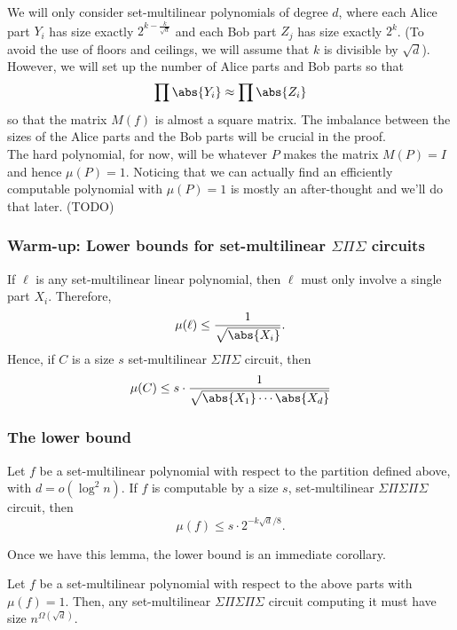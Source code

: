 We will only consider set-multilinear polynomials of degree $d$, where each Alice part $Y_i$ has size exactly $2^{k - \frac{k}{\sqrt{d}}}$ and each Bob part $Z_j$ has size exactly $2^k$. (To avoid the use of floors and ceilings, we will assume that $k$ is divisible by $\sqrt{d}$). However, we will set up the number of Alice parts and Bob parts so that
\[
  \prod \abs{Y_i} \approx \prod \abs{Z_i}
\]
so that the matrix $M(f)$ is almost a square matrix. The imbalance between the sizes of the Alice parts and the Bob parts will be crucial in the proof.\\

The hard polynomial, for now, will be whatever $P$ makes the matrix $M(P) = I$ and hence $\mu(P) = 1$. Noticing that we can actually find an efficiently computable polynomial with $\mu(P) = 1$ is mostly an after-thought and we'll do that later. (TODO)

\subsubsection{Warm-up: Lower bounds for set-multilinear $\Sigma\Pi\Sigma$ circuits}

If $\ell$ is any set-multilinear linear polynomial, then $\ell$ must only involve a single part $X_i$. Therefore,
\[
  \mu(\ell) \leq \frac{1}{\sqrt{\abs{X_i}}}. 
\]
Hence, if $C$ is a size $s$ set-multilinear $\Sigma\Pi\Sigma$ circuit, then
\[
  \mu(C) \leq s \cdot \frac{1}{\sqrt{\abs{X_1} \cdots \abs{X_d}}}
\]

\subsubsection{The lower bound}

\begin{lemma}\label{lem:lb-sml-depth-5}
  Let $f$ be a set-multilinear polynomial with respect to the partition defined above, with $d = o(\log^2 n)$. If $f$ is computable by a size $s$, set-multilinear $\Sigma\Pi\Sigma\Pi\Sigma$ circuit, then
  \[
    \mu(f) \leq s \cdot 2^{-k \sqrt{d}/8}. 
  \]
\end{lemma}

Once we have this lemma, the lower bound is an immediate corollary.

\begin{corollarywp}
  Let $f$ be a set-multilinear polynomial with respect to the above parts with $\mu(f) = 1$. Then, any set-multilinear $\Sigma\Pi\Sigma\Pi\Sigma$ circuit computing it must have size $n^{\Omega(\sqrt{d})}$. 
\end{corollarywp}


